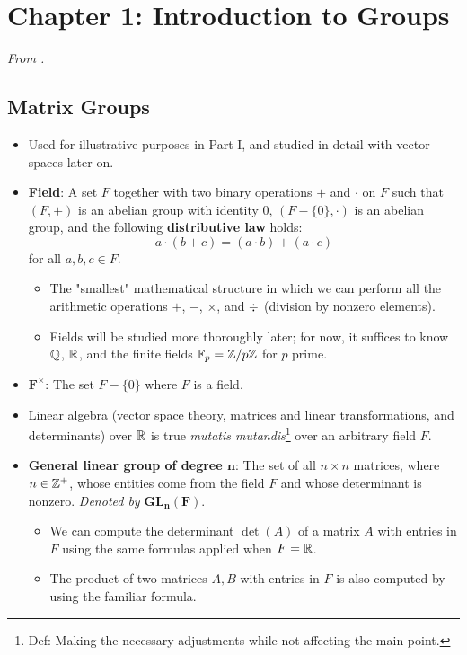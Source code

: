 \documentclass[../notes.tex]{subfiles}
\begin{document}
\section{Chapter 1: Introduction to Groups}
\emph{From \textcite{bib:DummitFoote}.}
\subsection*{Matrix Groups}
\begin{itemize}
    \item {}Used for illustrative purposes in Part I, and studied in detail with vector spaces later on.
    \item \textbf{Field}: A set $F$ together with two binary operations $+$ and $\cdot$ on $F$ such that $(F,+)$ is an abelian group with identity 0, $(F-\{0\},\cdot)$ is an abelian group, and the following \textbf{distributive law} holds:
    \begin{equation*}
        a\cdot(b+c) = (a\cdot b)+(a\cdot c)
    \end{equation*}
    for all $a,b,c\in F$.
    \begin{itemize}
        \item The "smallest" mathematical structure in which we can perform all the arithmetic operations $+$, $-$, $\times$, and $\divisionsymbol$ (division by nonzero elements).
        \item Fields will be studied more thoroughly later; for now, it suffices to know $\mathbb{Q}$, $\mathbb{R}$, and the finite fields $\mathbb{F}_p=\mathbb{Z}/p\mathbb{Z}$ for $p$ prime.
    \end{itemize}
    \item $\bm{F^\times}$: The set $F-\{0\}$ where $F$ is a field.
    \item Linear algebra (vector space theory, matrices and linear transformations, and determinants) over $\mathbb{R}$ is true \emph{mutatis mutandis}\footnote{Def: Making the necessary adjustments while not affecting the main point.} over an arbitrary field $F$.
    \item \textbf{General linear group of degree $\bm{n}$}: The set of all $n\times n$ matrices, where $n\in\mathbb{Z}^+$, whose entities come from the field $F$ and whose determinant is nonzero. \emph{Denoted by} $\bm{GL_n(F)}$.
    \begin{itemize}
        \item We can compute the determinant $\det(A)$ of a matrix $A$ with entries in $F$ using the same formulas applied when $F=\mathbb{R}$.
        \item The product of two matrices $A,B$ with entries in $F$ is also computed by using the familiar formula.

\end{itemize}
\end{itemize}
\end{document}
